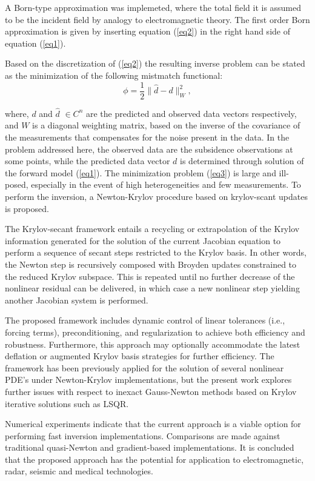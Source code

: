 \documentclass{report}
\begin{document}
A Born-type approximation was implemeted, where the total field it is
assumed to be the incident field by analogy to electromagnetic
theory.
The first order Born approximation is given by inserting equation
(\ref{eq2}) in the right hand side of equation (\ref{eq1}).

Based on the discretization of (\ref{eq2}) the resulting inverse
problem can be stated as the minimization of the following
mistmatch functional:
\begin{equation}
\phi =\frac{1}{2} \|\hat{d}-d\|_W^2, \label{eq3}
\end{equation}

where, $d$ and $\hat{d}$ $\in C^n$ are the predicted and observed
data vectors respectively, and $W$ is a diagonal weighting matrix,
based on the inverse of the covariance of the measurements that
compensates for the noise present in the data. In the problem
addressed here, the observed data are the subsidence observations
at some points, while the predicted data vector $d$ is determined
through solution of the forward model (\ref{eq1}). The
minimization problem (\ref{eq3}) is large and ill-posed,
especially in the event of high heterogeneities and few
measurements. To perform the inversion, a Newton-Krylov procedure
based on krylov-scant updates is proposed.

The Krylov-secant framework entails a recycling or extrapolation
of the Krylov information generated for the solution of the
current Jacobian equation to perform a sequence of secant steps
restricted to the Krylov basis. In other words, the Newton step is
recursively composed with Broyden updates constrained to the
reduced Krylov subspace. This is repeated until no further
decrease of the nonlinear residual can be delivered, in which case
a new nonlinear step yielding another Jacobian system is
performed.

The proposed framework includes dynamic control of linear
tolerances (i.e., forcing terms), preconditioning, and
regularization to achieve both efficiency and robustness.
Furthermore, this approach may optionally accommodate the latest
deflation or augmented Krylov basis strategies for further
efficiency. The framework has been previously applied for the
solution of several nonlinear PDE's under Newton-Krylov
implementations, but the present work explores further issues with
respect to inexact Gauss-Newton methods based on Krylov iterative
solutions such as LSQR.

Numerical experiments indicate that the current approach is a
viable option for performing fast inversion implementations.
Comparisons are made against traditional quasi-Newton and
gradient-based implementations. It is concluded that the proposed
approach has the potential for application to electromagnetic,
radar, seismic and medical technologies.
\end{document}
